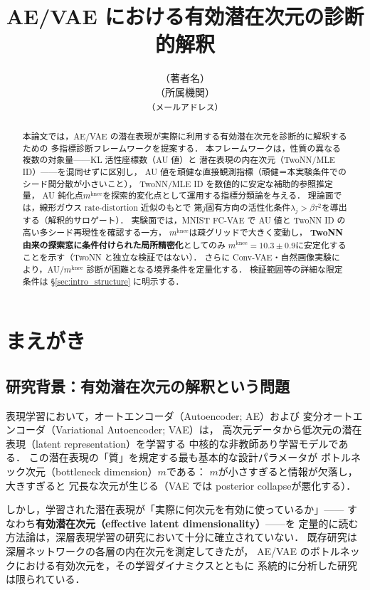 \documentclass[11pt,a4paper]{jsarticle}
\title{AE/VAE における有効潜在次元の診断的解釈}
\author{（著者名）\\
{\small （所属機関）}\\
{\small \texttt{（メールアドレス）}}}
\date{}
\newcommand{\mknee}{m^{\mathrm{knee}}}
\begin{document}
\maketitle

\begin{abstract}
本論文では，AE/VAE の潜在表現が実際に利用する有効潜在次元を診断的に解釈するための
多指標診断フレームワークを提案する．
本フレームワークは，性質の異なる複数の対象量——KL 活性座標数（AU 値）と
潜在表現の内在次元（TwoNN/MLE ID）——を混同せずに区別し，
AU 値を頑健な直接観測指標（頑健＝本実験条件でのシード間分散が小さいこと），
TwoNN/MLE ID を数値的に安定な補助的参照推定量，
AU 鈍化点$\mknee$を探索的変化点として運用する指標分類論を与える．
理論面では，線形ガウス rate-distortion 近似のもとで
第$j$固有方向の活性化条件$\lambda_j > \beta\tau^2$を導出する（解釈的サロゲート）．
実験面では，MNIST FC-VAE で AU 値と TwoNN ID の高い多シード再現性を確認する一方，
$\mknee$は疎グリッドで大きく変動し，
\textbf{TwoNN 由来の探索窓に条件付けられた局所精密化}としてのみ
$\mknee = 10.3 \pm 0.9$に安定化することを示す（TwoNN と独立な検証ではない）．
さらに Conv-VAE・自然画像実験により，AU/$\mknee$ 診断が困難となる境界条件を定量化する．
検証範囲等の詳細な限定条件は §\ref{sec:intro_structure} に明示する．
\end{abstract}

\section{まえがき}\label{sec:intro}

\subsection{研究背景：有効潜在次元の解釈という問題}\label{sec:intro_bg}

表現学習において，オートエンコーダ（Autoencoder; AE）および
変分オートエンコーダ（Variational Autoencoder; VAE）\cite{kingma2014vae}は，
高次元データから低次元の潜在表現（latent representation）を学習する
中核的な非教師あり学習モデルである\cite{bengio2013representation}．
この潜在表現の「質」を規定する最も基本的な設計パラメータが
ボトルネック次元（bottleneck dimension）$m$である：
$m$が小さすぎると情報が欠落し，大きすぎると
冗長な次元が生じる（VAE では posterior collapse\cite{lucas2019elbo}が悪化する）．

しかし，学習された潜在表現が「実際に何次元を有効に使っているか」——
すなわち\textbf{有効潜在次元（effective latent dimensionality）}——を
定量的に読む方法論は，深層表現学習の研究において十分に確立されていない．
既存研究\cite{ansuini2019intrinsic,valeriani2023geometry}は
深層ネットワークの各層の内在次元を測定してきたが，
AE/VAE のボトルネックにおける有効次元を，その学習ダイナミクスとともに
系統的に分析した研究は限られている．
\end{document}
